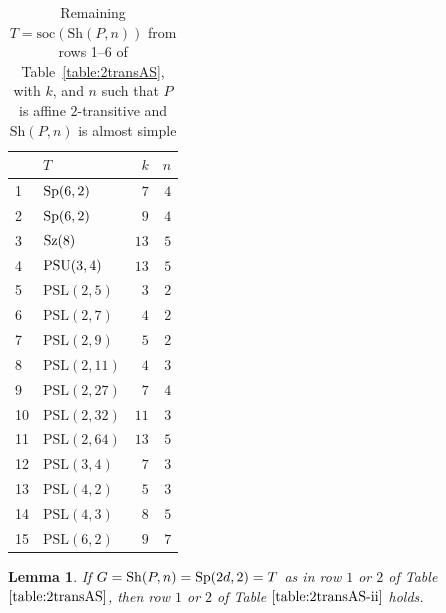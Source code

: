 \documentclass[12pt]{amsart}
\newtheorem{lem}[thm]{Lemma}
\theoremstyle{remark}
\theoremstyle{definition}
\newcommand{\soc}{\mathrm{soc}}
\newcommand{\PSL}{\mathrm{PSL}}
\newcommand{\sym}{\mathrm{Sym}}
\newcommand{\sh}{\mathrm{Sh}}
\newcommand{\PSU}{\textnormal{PSU}}
\newcommand{\Sz}{\textnormal{Sz}}
\newcommand{\Sp}{\textnormal{Sp}}
\begin{document}
\begin{table}[ht]
\begin{center}
\begin{tabular}{llrr}
  & $T$ & $k$ & $n$ \\
\hline
\sf\small 1 & $\Sp(6,2)$ & $7$ & $4$ \\
\sf\small 2 & $\Sp(6,2)$ & $9$ & $4$ \\
\sf\small 3 & $\Sz(8)$ & $13$ & $5$ \\
\sf\small 4 & $\PSU(3,4)$ & $13$ & $5$ \\
\sf\small 5 & $\PSL(2,5)$ & $3$ & $2$ \\
\sf\small 6 & $\PSL(2,7)$ & $4$ & $2$ \\
\sf\small 7 & $\PSL(2,9)$ & $5$ & $2$ \\
\sf\small 8 & $\PSL(2,11)$ & $4$ & $3$ \\
\sf\small 9 & $\PSL(2,27)$ & $7$ & $4$ \\
\sf\small 10 & $\PSL(2,32)$ & $11$ & $3$ \\
\sf\small 11 & $\PSL(2,64)$ & $13$ & $5$ \\
\sf\small 12 & $\PSL(3,4)$ & $7$ & $3$ \\
\sf\small 13 & $\PSL(4,2)$ & $5$ & $3$ \\
\sf\small 14 & $\PSL(4,3)$ & $8$ & $5$ \\
\sf\small 15 & $\PSL(6,2)$ & $9$ & $7$ \\
\end{tabular}
\end{center}
\caption{Remaining $T = \soc(\sh(P,n))$ from rows 1--6 of Table~\ref{table:2transAS}, with $k$, and $n$ such that $P$ is affine $2$-transitive and $\sh(P,n)$ is almost simple}
\label{table:2transAS-ii}
\end{table}

\begin{lem}
\label{lem:2-trans Sp}
If $G = \sh(P,n) = \Sp(2d,2) = T$ as in row $1$ or $2$ of Table $\ref{table:2transAS}$, then row $1$ or $2$ of Table $\ref{table:2transAS-ii}$ holds.
\end{lem}
\end{document}
